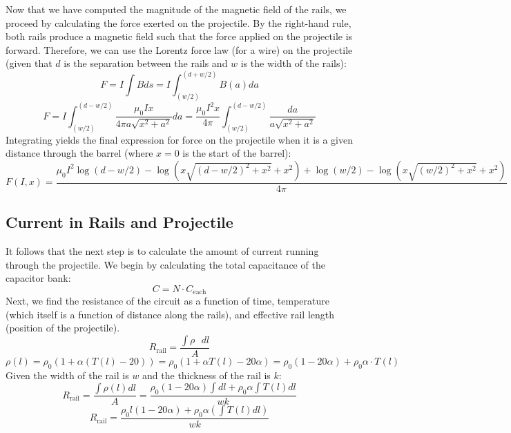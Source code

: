 \documentclass[12pt]{article}
\begin{document}
Now that we have computed the magnitude of the magnetic field of the rails, we proceed by calculating the force exerted on the projectile. By the right-hand rule, both rails produce a magnetic field such that the force applied on the projectile is forward. Therefore, we can use the Lorentz force law (for a wire) on the projectile (given that $d$ is the separation between the rails and $w$ is the width of the rails): 
\begin{equation}
    F = I \int B ds = I \int_{(w/2)}^{(d + w/2)} B(a) da
\end{equation}
\begin{equation}
    F = I \int_{(w/2)}^{(d - w/2)} \frac{\mu_0 I x}{4\pi a \sqrt{x^2 + a^2}} da = 
    \frac{\mu_0 I^2 x}{4\pi} \int_{(w/2)}^{(d - w/2)} \frac{da}{a \sqrt{x^2 + a^2}}
\end{equation}
Integrating yields the final expression for force on the projectile when it is a given distance through the barrel (where $x = 0$ is the start of the barrel):
\begin{equation}
    F(I, x) =
    \frac{\mu_0 I^2 \log(d - w/2) - \log(x\sqrt{(d - w/2)^2 + x^2} + x^2) + \log(w/2) - \log(x\sqrt{(w/2)^2 + x^2} + x^2)}{4\pi}
    \label{eqn:eqn1}
\end{equation}

\subsection{Current in Rails and Projectile}
It follows that the next step is to calculate the amount of current running through the projectile. We begin by calculating the total capacitance of the capacitor bank:
\begin{equation}
    C = N \cdot C_{\text{each}}
\end{equation}
Next, we find the resistance of the circuit as a function of time, temperature (which itself is a function of distance along the rails), and effective rail length (position of the projectile).
\begin{equation}
R_{\text{rail}} = \frac{\int\rho\text{ }dl}{A}
\end{equation}
\begin{equation}
\rho(l) = \rho_{0}(1 + \alpha (T(l) - 20)) = \rho_{0}(1 + \alpha T(l) - 20\alpha) = \rho_{0}(1 - 20\alpha) + \rho_{0}\alpha \cdot T(l)
\end{equation}
Given the width of the rail is $w$ and the thickness of the rail is $k$:
\begin{equation}
R_{\text{rail}} = \frac{\int \rho(l) dl}{A} = \frac{\rho_{0}(1 - 20\alpha) \int dl + \rho_{0}\alpha \int T(l) dl}{wk}
\end{equation}
\begin{equation}
R_{\text{rail}} = \frac{\rho_{0}l(1 - 20\alpha) + \rho_{0}\alpha (\int T(l) dl)}{wk}
\label{eqn:eqn2}
\end{equation}
\end{document}

